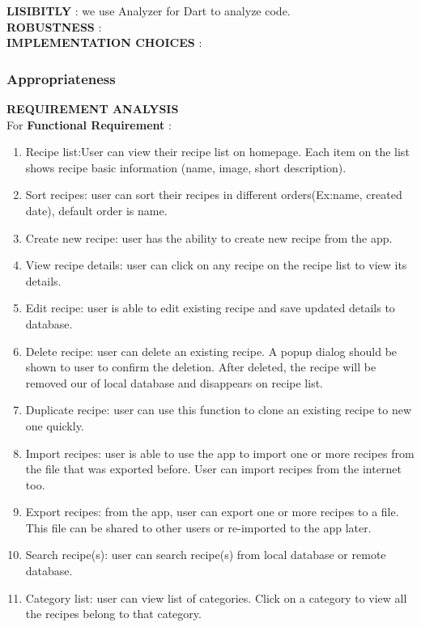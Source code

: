 \documentclass{article}
\begin{document}
 \textbf{LISIBITLY} : we use Analyzer for Dart to analyze code. \\
 \textbf{ROBUSTNESS}  :  \\
 \textbf{IMPLEMENTATION CHOICES} : \\  

\subsubsection{Appropriateness}
\textbf{REQUIREMENT ANALYSIS  }\\

    For \textbf{ Functional Requirement} :   \\
    \begin{enumerate}
        \item  Recipe list:User can view their recipe list on homepage. Each item on the list shows recipe basic information (name, image, short description). \\
        \item Sort recipes: user can sort their recipes in different orders(Ex:name, created date), default order is name. 
        \item Create new recipe: user has the ability to create new recipe from the app.
        \item View recipe details: user can click on any recipe on the recipe list to view its details.
        \item Edit recipe: user is able to edit existing recipe and save updated details to database.
        \item Delete recipe: user can delete an existing recipe. A popup dialog should be shown to user to confirm the deletion. After deleted, the recipe will be removed our of local database and disappears on recipe list.
        \item  Duplicate recipe: user can use this function to clone an existing recipe to new one quickly.
        \item Import recipes: user is able to use the app to import one or more recipes from the file that was exported before. User can import recipes from the internet too.
        \item Export recipes: from the app, user can export one or more recipes to a file. This file can be shared to other users or re-imported to the app later.
        \item Search recipe(s): user can search recipe(s) from local database or remote database.
        \item Category list: user can view list of categories. Click on a category to view all the recipes belong to that category.

\end{enumerate}
\end{document}
